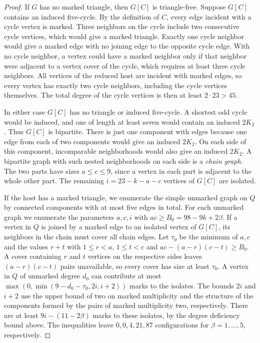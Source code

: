 \documentclass[preprint,11pt,numbers]{elsarticle-arxiv}
\numberwithin{equation}{section}
\theoremstyle{definition}
\begin{document}
\begin{proof}
If $G$ has no marked triangle, then $G[C]$ is triangle-free.
Suppose $G[C]$ contains an induced five-cycle. By the definition
of $C$, every edge incident with a cycle vertex is marked.
Three neighbors on the cycle include two consecutive cycle
vertices, which would give a marked triangle. Exactly one
cycle neighbor would give a marked edge with no joining edge
to the opposite cycle edge. With no cycle neighbor, a vertex
could have a marked neighbor only if that neighbor were adjacent
to a vertex cover of the cycle, which requires at least three
cycle neighbors. All vertices of the reduced host are incident
with marked edges, so every vertex has exactly two cycle
neighbors, including the cycle vertices themselves. The total
degree of the cycle vertices is then at least $2\cdot23>45$.

In either case $G[C]$ has no triangle or induced five-cycle.
A shortest odd cycle would be induced, and one of length at
least seven would contain an induced $2K_2$. Thus $G[C]$ is
bipartite. There is just one component with edges because one
edge from each of two components would give an induced $2K_2$.
On each side of this component, incomparable neighborhoods
would also give an induced $2K_2$. A bipartite graph with
such nested neighborhoods on each side is a \emph{chain graph}.
The two parts have sizes $a\le c\le9$, since a vertex in each
part is adjacent to the whole other part. The remaining
$i=23-k-a-c$ vertices of $G[C]$ are isolated.

If the host has a marked triangle, we enumerate the simple
unmarked graph on $Q$ by connected components with at most
five edges in total. For each unmarked graph we enumerate
the parameters $a,c,i$ with $ac\ge B_0=98-9k+2\beta$.
If a vertex in $Q$ is joined by a marked edge to an isolated vertex
of $G[C]$, its neighbors in the chain must cover all chain edges.
Let $\tau_0$
be the minimum of $a,c$ and the values $r+t$ with
$1\le r<a$, $1\le t<c$ and $ac-(a-r)(c-t)\ge B_0$.
A cover containing $r$ and $t$ vertices on the respective
sides leaves $(a-r)(c-t)$ pairs unavailable, so every cover
has size at least $\tau_0$. A vertex in $Q$ of unmarked
degree $d_0$ can contribute at most
$\max(0,\min(9-d_0-\tau_0,2i,i+2))$ marks to the isolates.
The bounds $2i$ and $i+2$ use the upper bound of two on marked
multiplicity and the structure of the components formed by the
pairs of marked multiplicity two,
respectively. There are at least $9i-(11-2\beta)$ marks
to these isolates, by the degree deficiency bound above.
The inequalities leave $0,0,4,21,87$ configurations for
$\beta=1,\ldots,5$, respectively.


\end{proof}
\end{document}
